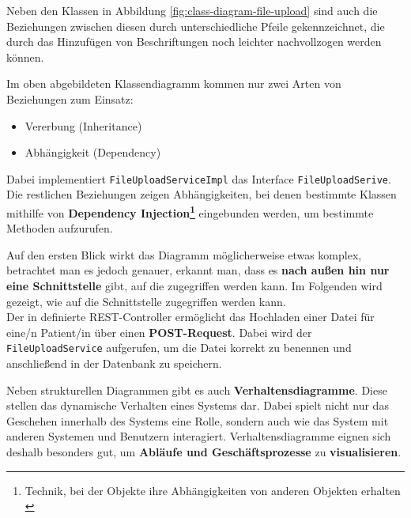         Neben den Klassen in Abbildung \ref{fig:class-diagram-file-upload} sind auch die Beziehungen zwischen diesen durch unterschiedliche Pfeile gekennzeichnet, die durch das Hinzufügen von Beschriftungen noch leichter nachvollzogen werden können.

        \clearpage

        Im oben abgebildeten Klassendiagramm kommen nur zwei Arten von Beziehungen zum Einsatz:
        \begin{itemize}
            \item Vererbung (Inheritance)
            \item Abhängigkeit (Dependency)
        \end{itemize}

        Dabei implementiert \lstinline{FileUploadServiceImpl} das Interface \lstinline{FileUploadSerive}. Die restlichen Beziehungen zeigen Abhängigkeiten, bei denen bestimmte Klassen mithilfe von \textbf{Dependency Injection\footnote{Technik, bei der Objekte ihre Abhängigkeiten von anderen Objekten erhalten \cite{EA:Web22}}} eingebunden werden, um bestimmte Methoden aufzurufen. 
        \cite{EA:Web21}

        Auf den ersten Blick wirkt das Diagramm möglicherweise etwas komplex, betrachtet man es jedoch genauer, erkannt man, dass es \textbf{nach außen hin nur eine Schnittstelle} gibt, auf die zugegriffen werden kann. Im Folgenden wird gezeigt, wie auf die Schnittstelle zugegriffen werden kann. \\
    
       
    
        Der in  definierte REST-Controller ermöglicht das Hochladen einer Datei für eine/n Patient/in über einen \textbf{POST-Request}. Dabei wird der \\ \lstinline{FileUploadService} aufgerufen, um die Datei korrekt zu benennen und anschließend in der Datenbank zu speichern.

        \clearpage
    

        Neben strukturellen Diagrammen gibt es auch \textbf{Verhaltensdiagramme}.
        Diese stellen das dynamische Verhalten eines Systems dar.
        Dabei spielt nicht nur das Geschehen innerhalb des Systems eine Rolle, sondern auch wie das System mit anderen Systemen und Benutzern interagiert. Verhaltensdiagramme eignen sich deshalb besonders gut, um \textbf{Abläufe und Geschäftsprozesse} zu \textbf{visualisieren}.
        \cite{EA:Web18, EA:Web20}

